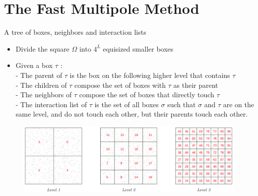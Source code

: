 \section{The Fast Multipole Method}

\begin{frame}{A tree of boxes, neighbors and interaction lists}
  \begin{itemize}
      \item Divide the square $\Omega$ into $4^L$ equisized smaller boxes
      \vspace{4mm}
      \item Given a box $\tau$ :\\
          - The parent of $\tau$ is the box on the following higher level that contains $\tau$\\
          - The children of $\tau$ compose the set of boxes with $\tau$ as their parent\\
          - The neighbors of $\tau$ compose the set of boxes that directly touch $\tau$\\
          - The interaction list of $\tau$ is the set of all boxes $\sigma$ such that $\sigma$ and $\tau$ are on the same level, and do not touch each other, but their parents touch each other.\\
  \end{itemize}
    \vspace{4mm}
  \begin{figure}[htp]
      \includegraphics[width=21cm]{presentation/img/tree_of_boxes.png}
      \label{fig:particles}
  \end{figure}

\end{frame}


